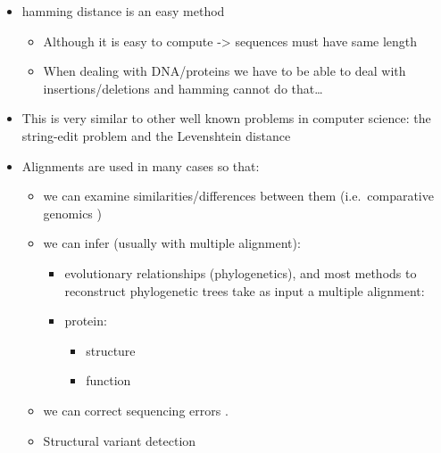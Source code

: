 \documentclass[
  11pt,
  twoside]{scrbook}
\begin{document}
\begin{itemize}
\item
  hamming distance is an easy method \autocite{hammingCodingInformationTheory1980}

  \begin{itemize}
  \item
    Although it is easy to compute -\textgreater{} sequences must have same length
  \item
    When dealing with DNA/proteins we have to be able to deal with insertions/deletions and hamming cannot do that\ldots{}
  \end{itemize}
\item
  This is very similar to other well known problems in computer science: the string-edit problem \autocite{gusfieldAlgorithmsStringsTrees1997} and the Levenshtein distance \autocite{levenshteinBinaryCodesCapable1966}
\item
  Alignments are used in many cases so that:

  \begin{itemize}
  \item
    we can examine similarities/differences between them (i.e.~comparative genomics ) \autocite{hardisonComparativeGenomics2003}
  \item
    we can infer (usually with multiple alignment):

    \begin{itemize}
    \item
      evolutionary relationships (phylogenetics), and most methods to reconstruct phylogenetic trees take as input a multiple alignment: \autocite{felsensteinEvolutionaryTreesDNA1981,kumarMEGAMolecularEvolutionary1994,kozlovRAxMLNGFastScalable2019,guindonNewAlgorithmsMethods2010,priceFastTreeApproximatelyMaximumLikelihood2010}
    \item
      protein:

      \begin{itemize}
      \item
        structure \autocites[ ]{jumperHighlyAccurateProtein2021,karplusPredictingProteinStructure1999}
      \item
        function \autocite{watsonPredictingProteinFunction2005,leePredictingProteinFunction2007}
      \end{itemize}
    \end{itemize}
  \item
    we can correct sequencing errors \autocite{hacklProovreadLargescaleHighaccuracy2014,korenHybridErrorCorrection2012,salmelaCorrectingErrorsShort2011}.
  \item
    Structural variant detection \autocite{medvedevComputationalMethodsDiscovering2009,mahmoudStructuralVariantCalling2019}
  \end{itemize}
\end{itemize}
\end{document}
